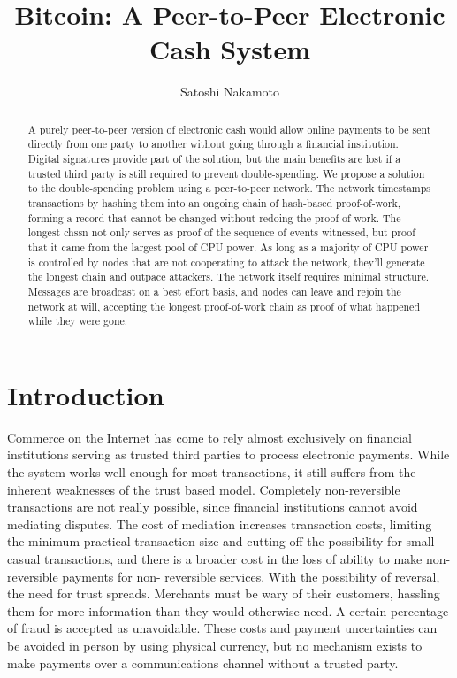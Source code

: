 \documentclass[11pt]{article}
\author{Satoshi Nakamoto}
\date{}
\title{Bitcoin: A Peer-to-Peer Electronic Cash System}
\begin{document}
\maketitle
\begin{abstract}
A purely peer-to-peer version of electronic cash would allow online payments to be sent directly from one party to another without going through a financial institution.
Digital signatures provide part of the solution, but the main benefits are lost if a trusted third party is still required to prevent double-spending.
We propose a solution to the double-spending problem using a peer-to-peer network.
The network timestamps transactions by hashing them into an ongoing chain of hash-based proof-of-work, forming a record that cannot be changed without redoing the proof-of-work.
The longest chssn not only serves as proof of the sequence of events witnessed, but proof that it came from the largest pool of CPU power.
As long as a majority of CPU power is controlled by nodes that are not cooperating to attack the network, they'll generate the longest chain and outpace attackers.
The network itself requires minimal structure.
Messages are broadcast on a best effort basis, and nodes can leave and rejoin the network at will, accepting the longest proof-of-work chain as proof of what happened while they were gone.
\end{abstract}

\section{Introduction}
\label{sec:org1b5a6c6}
Commerce on the Internet has come to rely almost exclusively on financial institutions serving as trusted third parties to process electronic payments.
While the system works well enough for most transactions, it still suffers from the inherent weaknesses of the trust based model.
Completely non-reversible transactions are not really possible, since financial institutions cannot avoid mediating disputes.
The cost of mediation increases transaction costs, limiting the minimum practical transaction size and cutting off the possibility for small casual transactions, and there is a broader cost in the loss of ability to make non-reversible payments for non- reversible services.
With the possibility of reversal, the need for trust spreads.
Merchants must be wary of their customers, hassling them for more information than they would otherwise need.
A certain percentage of fraud is accepted as unavoidable.
These costs and payment uncertainties can be avoided in person by using physical currency, but no mechanism exists to make payments over a communications channel without a trusted party.
\end{document}
